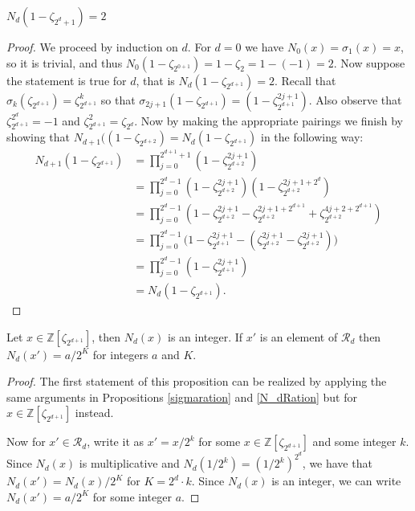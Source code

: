 \documentclass[12pt]{dalthesis}
\begin{document}
\begin{proposition}
\label{N_d=2}
$N_d(1- \zeta_{2^d+1}) = 2$
\end{proposition}
\begin{proof}
We proceed by induction on $d$. For $d=0$ we have $N_0(x) = \sigma_1(x) = x$, so it is trivial, and thus $N_0(1-\zeta_{2^{0+1}}) = 1- \zeta_{2} = 1 - (-1) = 2$. Now suppose the statement is true for $d$, that is $N_d (1- \zeta_{2^{d+1}}) = 2$. Recall that $\sigma_k (\zeta_{2^{d+1}}) = \zeta_{2^{d+1}}^k$ so that $\sigma_{2j+1}(1-\zeta_{2^{d+1}}) = (1-\zeta_{2^{d+1}}^{2j+1})$. Also observe that $\zeta_{2^{d+1}}^{2^d} = -1$ and $\zeta_{2^{d+1}}^{2} = \zeta_{2^d}$. Now by making the appropriate pairings we finish by showing that $N_{d+1}((1-\zeta_{2^{d+2}}) = N_{d}(1-\zeta_{2^{d+1}})$ in the following way:
\begin{equation*}
\begin{split}
N_{d+1}(1-\zeta_{2^{d+1}}) & = \prod_{j=0}^{2^{d+1}+1} (1-\zeta_{2^{d+2}}^{2j+1}) \\
& = \prod_{j=0}^{2^{d}-1} (1-\zeta_{2^{d+2}}^{2j+1})(1-\zeta_{2^{d+2}}^{2j+1 +2^{d}}) \\
& = \prod_{j=0}^{2^{d}-1} (1-\zeta_{2^{d+2}}^{2j+1} - \zeta_{2^{d+2}}^{2j+1 + 2^{d+1}} + \zeta_{2^{d+2}}^{4j+2+2^{d+1}}) \\
& = \prod_{j=0}^{2^{d}-1} \big( 1-\zeta_{2^{d+1}}^{2j+1} - (\zeta_{2^{d+2}}^{2j+1} - \zeta_{2^{d+2}}^{2j+1}) \big) \\
& = \prod_{j=0}^{2^{d}-1} (1-\zeta_{2^{d+1}}^{2j+1}) \\
& = N_d(1-\zeta_{2^{d+1}}). 
\end{split}
\end{equation*}
\end{proof}

\begin{proposition}
\label{N_dint}
Let $x \in \mathbb{Z}[\zeta_{2^{d+1}}]$, then $N_d(x)$ is an integer. If $x'$ is an element of $\mathcal{R}_d$ then $N_d(x') = a/2^K$ for integers $a$ and $K$.
\end{proposition}
\begin{proof}
The first statement of this proposition can be realized by applying the same arguments in Propositions \ref{sigmaration} and \ref{N_dRation} but for $x \in \mathbb{Z}[\zeta_{2^{d+1}}]$ instead.

Now for $x' \in \mathcal{R}_d$, write it as $x' = x/2^k$ for some $x \in \mathbb{Z}[\zeta_{2^{d+1}}]$ and some integer $k$. Since $N_d(x)$ is multiplicative and $N_d(1/2^k) = (1/2^k)^{2^d}$, we have that $N_d(x') = N_d(x)/2^K$ for $K = 2^d\cdot k$. Since $N_d(x)$ is an integer, we can write $N_d(x') = a/2^K$ for some integer $a$.
\end{proof}
\end{document}
